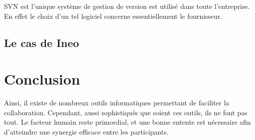 SVN est l'unique système de gestion de version est utilisé dans toute l'entreprise. En effet le choix d'un tel logiciel concerne essentiellement le fournisseur.

\subsection{Le cas de Ineo}

\section{Conclusion}

Ainsi, il existe de nombreux outils informatiques permettant de faciliter la collaboration. Cependant, aussi sophistiqués que soient ces outils, ils ne font pas tout. Le facteur humain reste primordial, et une bonne entente est nécessaire afin d’atteindre une synergie efficace entre les participants.
